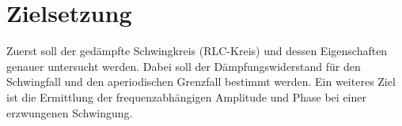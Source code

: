 \section{Zielsetzung}
\label{sec:Zielsetzung}
Zuerst soll der gedämpfte Schwingkreis (RLC-Kreis) und dessen Eigenschaften genauer untersucht werden.
Dabei soll der Dämpfungswiderstand für den Schwingfall und den aperiodischen Grenzfall bestimmt werden.
Ein weiteres Ziel ist die Ermittlung der frequenzabhängigen Amplitude und Phase bei einer erzwungenen Schwingung.